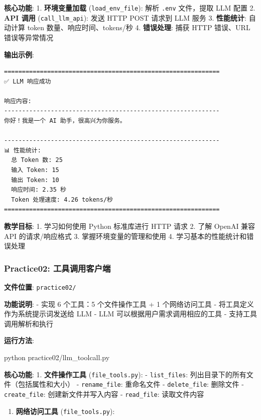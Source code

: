 \documentclass[]{article}
\newenvironment{Shaded}{}{}
\newcommand{\ExtensionTok}[1]{#1}
\newcommand{\NormalTok}[1]{#1}
\providecommand{\tightlist}{%
  \setlength{\itemsep}{0pt}\setlength{\parskip}{0pt}}
\begin{document}
\textbf{核心功能}: 1. \textbf{环境变量加载} (\texttt{load\_env\_file}):
解析 \texttt{.env} 文件，提取 LLM 配置 2. \textbf{API 调用}
(\texttt{call\_llm\_api}): 发送 HTTP POST 请求到 LLM 服务 3.
\textbf{性能统计}: 自动计算 token 数量、响应时间、tokens/秒 4.
\textbf{错误处理}: 捕获 HTTP 错误、URL 错误等异常情况

\textbf{输出示例}:

\begin{verbatim}
============================================================
✅ LLM 响应成功

响应内容:
------------------------------------------------------------
你好！我是一个 AI 助手，很高兴为你服务。

------------------------------------------------------------
📊 性能统计:
  总 Token 数: 25
  输入 Token: 15
  输出 Token: 10
  响应时间: 2.35 秒
  Token 处理速度: 4.26 tokens/秒
============================================================
\end{verbatim}

\textbf{教学目标}: 1. 学习如何使用 Python 标准库进行 HTTP 请求 2. 了解
OpenAI 兼容 API 的请求/响应格式 3. 掌握环境变量的管理和使用 4.
学习基本的性能统计和错误处理

\subsubsection{Practice02:
工具调用客户端}\label{practice02-ux5de5ux5177ux8c03ux7528ux5ba2ux6237ux7aef}

\textbf{文件位置}: \texttt{practice02/}

\textbf{功能说明}: - 实现 6 个工具：5 个文件操作工具 + 1 个网络访问工具
- 将工具定义作为系统提示词发送给 LLM - LLM
可以根据用户需求调用相应的工具 - 支持工具调用解析和执行

\textbf{运行方法}:

\begin{Shaded}
\begin{Highlighting}[]
\ExtensionTok{python}\NormalTok{ practice02/llm_toolcall.py}
\end{Highlighting}
\end{Shaded}

\textbf{核心功能}: 1. \textbf{文件操作工具} (\texttt{file\_tools.py}): -
\texttt{list\_files}: 列出目录下的所有文件（包括属性和大小） -
\texttt{rename\_file}: 重命名文件 - \texttt{delete\_file}: 删除文件 -
\texttt{create\_file}: 创建新文件并写入内容 - \texttt{read\_file}:
读取文件内容

\begin{enumerate}
\def\labelenumi{\arabic{enumi}.}
\setcounter{enumi}{1}
\tightlist
\item
  \textbf{网络访问工具} (\texttt{file\_tools.py}):
\end{enumerate}
\end{document}
